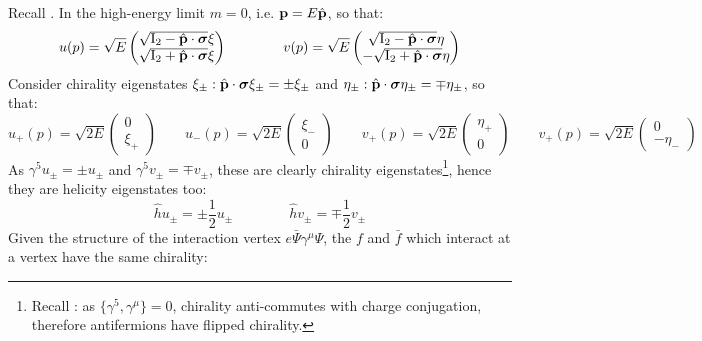 Recall . In the high-energy limit $ m = 0 $, i.e. $ \mathbf{p} = E \hat{\mathbf{p}} $, so that:
\begin{equation*}
  u(p) = \sqrt{E}
  \begin{pmatrix}
    \sqrt{\mathrm{I}_2 - \hat{\mathbf{p}} \cdot \boldsymbol{\sigma}} \xi \\
    \sqrt{\mathrm{I}_2 + \hat{\mathbf{p}} \cdot \boldsymbol{\sigma}} \xi
  \end{pmatrix}
  \qquad \qquad
  v(p) = \sqrt{E}
  \begin{pmatrix}
    \sqrt{\mathrm{I}_2 - \hat{\mathbf{p}} \cdot \boldsymbol{\sigma}} \eta \\
    - \sqrt{\mathrm{I}_2 + \hat{\mathbf{p}} \cdot \boldsymbol{\sigma}} \eta
  \end{pmatrix}
\end{equation*}
Consider chirality eigenstates $ \xi_\pm : \hat{\mathbf{p}} \cdot \boldsymbol{\sigma} \xi_\pm = \pm \xi_\pm $ and $ \eta_\pm : \hat{\mathbf{p}} \cdot \boldsymbol{\sigma} \eta_\pm = \mp \eta_\pm $, so that:
\begin{equation*}
  u_+(p) = \sqrt{2E} \begin{pmatrix} 0 \\ \xi_+ \end{pmatrix}
  \qquad
  u_-(p) = \sqrt{2E} \begin{pmatrix} \xi_- \\ 0 \end{pmatrix}
  \qquad
  v_+(p) = \sqrt{2E} \begin{pmatrix} \eta_+ \\ 0 \end{pmatrix}
  \qquad
  v_+(p) = \sqrt{2E} \begin{pmatrix} 0 \\ -\eta_- \end{pmatrix}
\end{equation*}
As $ \gamma^5 u_\pm = \pm u_\pm $ and $ \gamma^5 v_\pm = \mp v_\pm $, these are clearly chirality eigenstates\footnote{Recall : as $ \{\gamma^5,\gamma^\mu\} = 0 $, chirality anti-commutes with charge conjugation, therefore antifermions have flipped chirality.}, hence they are helicity eigenstates too:
\begin{equation}
  \hat{h} u_\pm = \pm \frac{1}{2} u_\pm
  \qquad \qquad
  \hat{h} v_\pm = \mp \frac{1}{2} v_\pm
  \label{eq:spin-hel-massless}
\end{equation}
Given the structure of the interaction vertex $ e \bar{\Psi} \gamma^\mu \Psi $, the $ f $ and $ \bar{f} $ which interact at a vertex have the same chirality:
